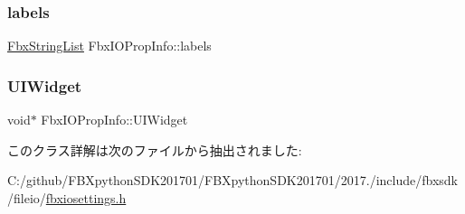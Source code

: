 \mbox{\label{class_fbx_i_o_prop_info_adee0d1340eefab937fe4af63e8172c53}} 
\subsubsection{\texorpdfstring{labels}{labels}}
{\footnotesize\ttfamily \hyperlink{class_fbx_string_list}{Fbx\+String\+List} Fbx\+I\+O\+Prop\+Info\+::labels}

\mbox{\label{class_fbx_i_o_prop_info_a2ea012986e65addbf7ae8cb3db723b7c}} 
\subsubsection{\texorpdfstring{U\+I\+Widget}{UIWidget}}
{\footnotesize\ttfamily void$\ast$ Fbx\+I\+O\+Prop\+Info\+::\+U\+I\+Widget}



このクラス詳解は次のファイルから抽出されました\+:\begin{DoxyCompactItemize}
\item 
C\+:/github/\+F\+B\+Xpython\+S\+D\+K201701/\+F\+B\+Xpython\+S\+D\+K201701/2017./include/fbxsdk/fileio/\hyperlink{fbxiosettings_8h}{fbxiosettings.\+h}\end{DoxyCompactItemize}
